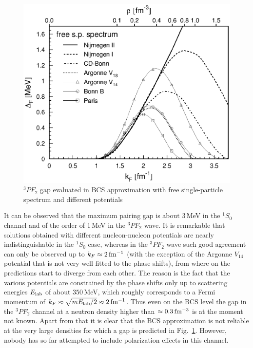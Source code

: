 \documentclass[runningheads]{svmult}
\def\pf{^3\!P\!F_2}
\def\ss{^1\!S_0}
\begin{document}
\begin{figure}[t] %
\includegraphics[height=.41\textheight,bb=40 380 40 720]{nsbk_3p2.ps}
\caption[]
{$\pf$ gap evaluated in BCS approximation with free single-particle spectrum 
and different potentials}
\label{f:3p2}
\end{figure} %
It can be observed that the maximum pairing gap is about $3\,$MeV in the 
$\ss$ channel and of the order of $1\,$MeV in the $\pf$ wave.
It is remarkable that solutions obtained with different nucleon-nucleon 
potentials are nearly indistinguishable in the $\ss$ case, 
whereas in the $\pf$ wave such good agreement can only be observed up to
$k_F \approx 2\,\rm fm^{-1}$
(with the exception of the Argonne $V_{14}$ potential that is not very well 
fitted to the phase shifts),
from where on the predictions start to diverge from each other.
The reason \cite{BEEHS98,ELGA98} 
is the fact that the various potentials are constrained by the
phase shifts only up to scattering energies $E_{\rm lab}$ of about $350\,$MeV, 
which roughly corresponds to a Fermi momentum of 
$k_F\approx \sqrt{mE_{\rm lab}/2} \approx 2\,\rm fm^{-1}$.
Thus even on the BCS level the gap in the $\pf$ channel
at a neutron density higher than $\approx 0.3\,\rm fm^{-3}$ 
is at the moment not known.
Apart from that it is clear that the BCS approximation is not reliable
at the very large densities for which a gap is predicted in Fig.~\ref{f:3p2}.
However, nobody has so far attempted to include polarization effects in 
this channel.
\end{document}
